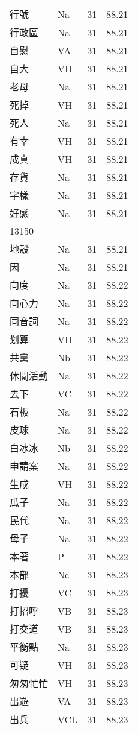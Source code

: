 \documentclass[twocolumn]{book}
\begin{document}
\begin{supertabular}{llrr}
行號 & Na & 31 &  88.21\\
行政區 & Na & 31 &  88.21\\
自慰 & VA & 31 &  88.21\\
自大 & VH & 31 &  88.21\\
老母 & Na & 31 &  88.21\\
死掉 & VH & 31 &  88.21\\
死人 & Na & 31 &  88.21\\
有幸 & VH & 31 &  88.21\\
成真 & VH & 31 &  88.21\\
存貨 & Na & 31 &  88.21\\
字樣 & Na & 31 &  88.21\\
好感 & Na & 31 &  88.21\\
13150\\
地殼 & Na & 31 &  88.21\\
因 & Na & 31 &  88.21\\
向度 & Na & 31 &  88.22\\
向心力 & Na & 31 &  88.22\\
同音詞 & Na & 31 &  88.22\\
划算 & VH & 31 &  88.22\\
共黨 & Nb & 31 &  88.22\\
休閒活動 & Na & 31 &  88.22\\
丟下 & VC & 31 &  88.22\\
石板 & Na & 31 &  88.22\\
皮球 & Na & 31 &  88.22\\
白冰冰 & Nb & 31 &  88.22\\
申請案 & Na & 31 &  88.22\\
生成 & VH & 31 &  88.22\\
瓜子 & Na & 31 &  88.22\\
民代 & Na & 31 &  88.22\\
母子 & Na & 31 &  88.22\\
本著 & P & 31 &  88.22\\
本部 & Nc & 31 &  88.23\\
打擾 & VC & 31 &  88.23\\
打招呼 & VB & 31 &  88.23\\
打交道 & VB & 31 &  88.23\\
平衡點 & Na & 31 &  88.23\\
可疑 & VH & 31 &  88.23\\
匆匆忙忙 & VH & 31 &  88.23\\
出遊 & VA & 31 &  88.23\\
出兵 & VCL & 31 &  88.23\\

\end{supertabular}
\end{document}

